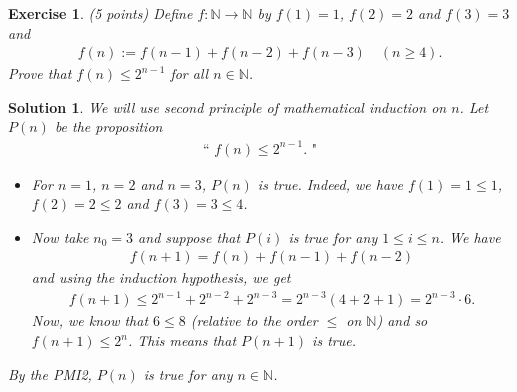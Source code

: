 \documentclass[12pt]{article}
\newcommand{\bN}{\mathbb{N}}
\newcommand{\ra}{\rightarrow}
\theoremstyle{plain}
\newtheorem{exer}{\textbf{Exercise}}}
\theoremstyle{plain}
\newtheorem*{sol}{\textbf{Solution}}}
\theoremstyle{plain}
\theoremstyle{plain}
\begin{document}
\begin{exer}
(5 points)
Define $f : \bN \ra \bN$ by $f(1) = 1$, $f(2) = 2$ and $f(3) = 3$ and
	\begin{align*}
	f(n) := f(n - 1) + f(n- 2) + f(n -3) \quad (n \geq 4 ) .
	\end{align*}
Prove that $f(n) \leq 2^{n-1}$ for all $n \in \bN$.
\end{exer}
\begin{sol}
We will use second principle of mathematical induction on $n$. Let $P(n)$ be the proposition
	\begin{align*}
	\text{`` } f(n) \leq 2^{n-1} \text{. "}
	\end{align*}
	\begin{itemize}
	\item For $n = 1$, $n = 2$ and $n = 3$, $P(n)$ is true. Indeed, we have $f(1) = 1 \leq 1$, $f(2) = 2 \leq 2$ and $f(3) = 3 \leq 4$.
	\item Now take $n_0 = 3$ and suppose that $P(i)$ is true for any $1 \leq i \leq n$. We have
		\begin{align*}
		f(n + 1) = f(n) + f(n-1) + f(n -2 )
		\end{align*}	
	and using the induction hypothesis, we get
		\begin{align*}
		f(n + 1) \leq 2^{n-1} + 2^{n-2} + 2^{n-3} = 2^{n-3} (4 + 2 + 1) = 2^{n-3}\cdot 6 .
\end{align*}			
	Now, we know that $6 \leq 8$ (relative to the order $\leq$ on $\bN$) and so $f(n + 1) \leq 2^{n}$. This means that $P(n + 1)$ is true.	 
	\end{itemize}
By the PMI2, $P(n)$ is true for any $n \in \bN$.
\end{sol}
\end{document}
